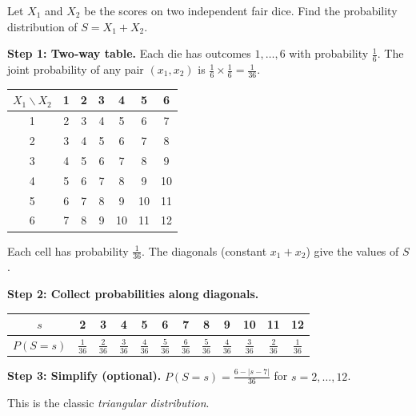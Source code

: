 \documentclass[11pt]{article}
\begin{document}
\begin{exoresolu}
Let $X_1$ and $X_2$ be the scores on two independent fair dice.  Find the probability distribution of $S = X_1 + X_2$.

\tcblower
\textbf{Step 1: Two‑way table.}  Each die has outcomes $1,\dots,6$ with probability $\frac16$.  The joint probability of any pair $(x_1,x_2)$ is $\frac16 \times \frac16 = \frac1{36}$.

\begin{center}
\begin{tabular}{|c|cccccc|}\hline
$X_1 \backslash X_2$ & 1 & 2 & 3 & 4 & 5 & 6 \\ \hline
1 & 2 & 3 & 4 & 5 & 6 & 7 \\
2 & 3 & 4 & 5 & 6 & 7 & 8 \\
3 & 4 & 5 & 6 & 7 & 8 & 9 \\
4 & 5 & 6 & 7 & 8 & 9 & 10 \\
5 & 6 & 7 & 8 & 9 & 10 & 11 \\
6 & 7 & 8 & 9 & 10 & 11 & 12 \\ \hline
\end{tabular}
\end{center}
Each cell has probability $\frac1{36}$.  The diagonals (constant $x_1+x_2$) give the values of $S$.

\textbf{Step 2: Collect probabilities along diagonals.}

\begin{center}
\begin{tabular}{|c|ccccccccccc|}\hline
$s$ & 2 & 3 & 4 & 5 & 6 & 7 & 8 & 9 & 10 & 11 & 12 \\ \hline
$P(S=s)$ & $\frac1{36}$ & $\frac2{36}$ & $\frac3{36}$ & $\frac4{36}$ & $\frac5{36}$ & $\frac6{36}$ & $\frac5{36}$ & $\frac4{36}$ & $\frac3{36}$ & $\frac2{36}$ & $\frac1{36}$ \\ \hline
\end{tabular}
\end{center}

\textbf{Step 3: Simplify (optional).}  $P(S=s) = \frac{6-|s-7|}{36}$ for $s=2,\dots,12$.

This is the classic \emph{triangular distribution}.
\end{exoresolu}
\end{document}
